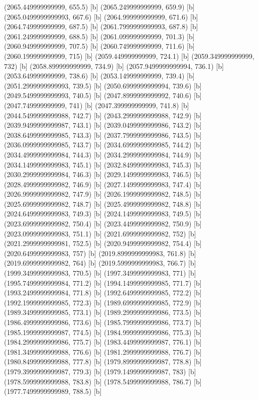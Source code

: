 {{{(2065.449999999999, 655.5) [b] 
(2065.249999999999, 659.9) [b] 
(2065.0499999999993, 667.6) [b] 
(2064.999999999999, 671.6) [b] 
(2064.749999999999, 687.5) [b] 
(2061.7999999999993, 687.8) [b] 
(2061.249999999999, 688.5) [b] 
(2061.099999999999, 701.3) [b] 
(2060.949999999999, 707.5) [b] 
(2060.749999999999, 711.6) [b] 
(2060.199999999999, 715) [b] 
(2059.449999999999, 724.1) [b] 
(2059.349999999999, 732) [b] 
(2058.899999999999, 734.9) [b] 
(2057.9499999999994, 736.1) [b] 
(2053.649999999999, 738.6) [b] 
(2053.149999999999, 739.4) [b] 
(2051.2999999999993, 739.5) [b] 
(2050.6999999999994, 739.6) [b] 
(2049.5499999999993, 740.5) [b] 
(2047.8999999999992, 740.6) [b] 
(2047.749999999999, 741) [b] 
(2047.399999999999, 741.8) [b] 
(2044.5499999999988, 742.7) [b] 
(2043.2999999999988, 742.9) [b] 
(2039.9499999999987, 743.1) [b] 
(2039.0499999999986, 743.2) [b] 
(2038.6499999999985, 743.3) [b] 
(2037.7999999999986, 743.5) [b] 
(2036.0999999999985, 743.7) [b] 
(2034.6999999999985, 744.2) [b] 
(2034.4999999999984, 744.3) [b] 
(2034.2999999999984, 744.9) [b] 
(2034.1499999999983, 745.1) [b] 
(2032.8499999999983, 745.3) [b] 
(2030.2999999999984, 746.3) [b] 
(2029.1499999999983, 746.5) [b] 
(2028.4999999999982, 746.9) [b] 
(2027.1499999999983, 747.4) [b] 
(2026.9999999999982, 747.9) [b] 
(2026.1999999999982, 748.5) [b] 
(2025.6999999999982, 748.7) [b] 
(2025.4999999999982, 748.8) [b] 
(2024.6499999999983, 749.3) [b] 
(2024.1499999999983, 749.5) [b] 
(2023.6999999999982, 750.4) [b] 
(2023.4499999999982, 750.9) [b] 
(2023.0999999999983, 751.1) [b] 
(2021.6999999999982, 752) [b] 
(2021.2999999999981, 752.5) [b] 
(2020.9499999999982, 754.4) [b] 
(2020.6499999999983, 757) [b] 
(2019.8999999999983, 761.8) [b] 
(2019.6999999999982, 764) [b] 
(2019.5999999999983, 766.7) [b] 
(1999.3499999999983, 770.5) [b] 
(1997.3499999999983, 771) [b] 
(1995.7499999999984, 771.2) [b] 
(1994.1499999999985, 771.7) [b] 
(1993.2499999999984, 771.8) [b] 
(1992.6499999999985, 772.2) [b] 
(1992.1999999999985, 772.3) [b] 
(1989.6999999999985, 772.9) [b] 
(1989.3499999999985, 773.1) [b] 
(1989.2999999999986, 773.5) [b] 
(1986.4999999999986, 773.6) [b] 
(1985.7999999999986, 773.7) [b] 
(1985.1999999999987, 774.5) [b] 
(1984.9999999999986, 775.3) [b] 
(1984.2999999999986, 775.7) [b] 
(1983.4499999999987, 776.1) [b] 
(1981.3499999999988, 776.6) [b] 
(1981.2999999999988, 776.7) [b] 
(1980.8499999999988, 777.8) [b] 
(1979.8999999999987, 778.8) [b] 
(1979.3999999999987, 779.3) [b] 
(1979.1499999999987, 783) [b] 
(1978.5999999999988, 783.8) [b] 
(1978.5499999999988, 786.7) [b] 
(1977.7499999999989, 788.5) [b] 
}}}
